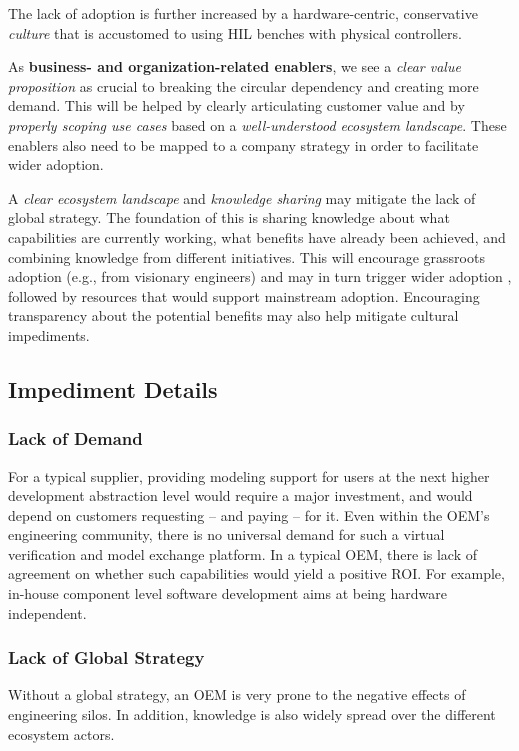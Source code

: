 The lack of adoption is further increased by a hardware-centric, conservative \emph{culture} that is accustomed to using HIL benches with physical controllers.

As \textbf{business- and organization-related enablers}, %
we see a \emph{clear value proposition} as crucial to breaking the circular dependency and creating more demand.
This will be helped by clearly articulating customer value and by \emph{properly scoping use cases} based on a \emph{well-understood ecosystem landscape}.
These enablers also need to be mapped to a company strategy in order to facilitate wider adoption. 

A \emph{clear ecosystem landscape} and \emph{knowledge sharing} may mitigate the lack of global strategy.
The foundation of this is sharing knowledge about what capabilities are currently working, what benefits have already been achieved, and combining knowledge from different initiatives.
This will encourage grassroots adoption (e.g., from visionary engineers) and may in turn trigger wider adoption
{, followed by resources that would support mainstream adoption. Encouraging transparency about the potential benefits may also help mitigate cultural impediments.}

\subsection{Impediment Details}
\subsubsection*{Lack of Demand}
For a typical supplier,
providing modeling support for users at the next higher development abstraction level would require a major investment,
and would depend on customers requesting -- and paying -- for it.
%
Even within the OEM's engineering community, there is no universal demand
for such a virtual verification and model exchange platform.
In a typical OEM, there is lack of agreement on whether such capabilities would yield a positive ROI.
For example, in-house component level software development aims at being hardware independent.


\subsubsection*{Lack of Global Strategy}
Without a global strategy, an OEM is very prone to the negative effects of engineering silos.
In addition, knowledge is also widely spread over the different ecosystem actors.

